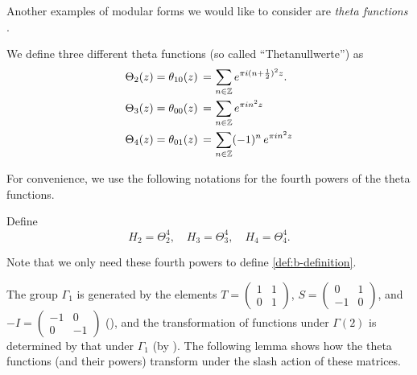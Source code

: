 Another examples of modular forms we would like to consider are \emph{theta functions} \cite[Section~3.1]{1-2-3}.
\begin{definition}\label{def:th00-th01-th10}
We define three different theta functions (so called ``Thetanullwerte'') as
\begin{align}
  \Theta_{2}(z) = \theta_{10}(z)\,=\, & \sum_{n\in\mathbb{Z}}e^{\pi i (n+\frac12)^2 z}. \notag \\
  \Theta_{3}(z) = \theta_{00}(z)\,=\, & \sum_{n\in\mathbb{Z}}e^{\pi i n^2 z} \notag \\
  \Theta_{4}(z) = \theta_{01}(z)\,=\, & \sum_{n\in\mathbb{Z}}(-1)^n\,e^{\pi i n^2 z} \notag \\
\end{align}
\end{definition}

For convenience, we use the following notations for the fourth powers of the theta functions.
\begin{definition}\label{def:H2-H3-H4}
Define
\begin{equation}
    H_2 = \Theta_2^4, \quad H_3 = \Theta_3^4, \quad H_4 = \Theta_4^4. \label{eqn:H2-H3-H4}
\end{equation}
\end{definition}
Note that we only need these fourth powers to define \eqref{def:b-definition}.

The group $\Gamma_1$ is generated by the elements $T=\left(\begin{smallmatrix}1&1\\0&1\end{smallmatrix}\right)$, $S=\left(\begin{smallmatrix}0&1\\-1&0\end{smallmatrix}\right)$, and $-I = \left(\begin{smallmatrix}-1&0\\0&-1\end{smallmatrix}\right)$ (), and the transformation of functions under $\Gamma(2)$ is determined by that under $\Gamma_1$ (by ).
The following lemma shows how the theta functions (and their powers) transform under the slash action of these matrices.

